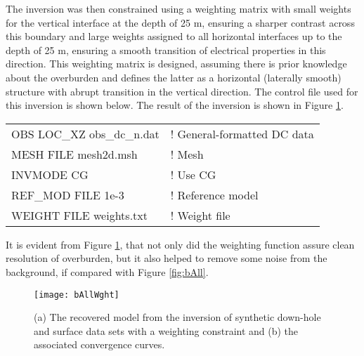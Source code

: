 The inversion was then constrained using a weighting matrix with small weights for the vertical interface at the depth of 25 m, ensuring a sharper contrast across this boundary and large weights assigned to all horizontal interfaces up to the depth of 25 m, ensuring a smooth transition of electrical properties in this direction. This weighting matrix is designed, assuming there is prior knowledge about the overburden and defines the latter as a horizontal (laterally smooth) structure with abrupt transition in the vertical direction. The control file used for this inversion is shown below. The result of the inversion is shown in Figure \ref{fig:bAllWght}.
%
\begin{fileExample}
\begin{tabular}{|ll|}
\hline
OBS LOC\_XZ obs\_dc\_n.dat & ! General-formatted DC data \\
MESH FILE mesh2d.msh & ! Mesh \\
INVMODE CG & ! Use CG \\
REF\_MOD FILE 1e-3 & ! Reference model \\
WEIGHT FILE weights.txt & ! Weight file \\
\hline
\end{tabular}
\end{fileExample}
%
It is evident from Figure \ref{fig:bAllWght}, that not only did the weighting function assure clean resolution of overburden, but it also helped to remove some noise from the background, if compared with Figure \ref{fig:bAll}.
%
\begin{figure}
\centering
\texttt{[image: bAllWght]}
\caption{(a) The recovered model from the inversion of synthetic down-hole and surface data sets with a weighting constraint and (b) the associated convergence curves.}
\label{fig:bAllWght}
\end{figure}

